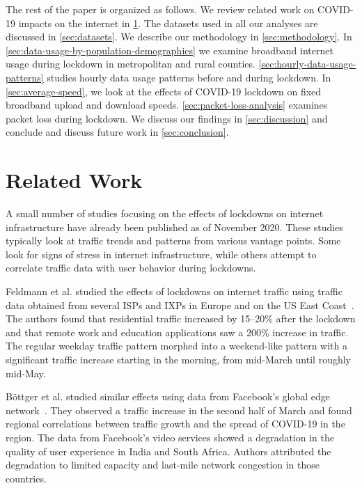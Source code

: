 \documentclass[conference,10pt]{IEEEtran}
\begin{document}
The rest of the paper is organized as follows. We review related work on COVID-19 impacts on the internet in \cref{sec:related-work}. The datasets used in all our analyses are discussed in \cref{sec:datasets}. We describe our methodology in \cref{sec:methodology}. In \cref{sec:data-usage-by-population-demographics} we examine broadband internet usage during lockdown in metropolitan and rural counties. \cref{sec:hourly-data-usage-patterns} studies hourly data usage patterns before and during lockdown. In \cref{sec:average-speed}, we look at the effects of COVID-19 lockdown on fixed broadband upload and download speeds. \cref{sec:packet-loss-analysis} examines packet loss during lockdown. We discuss our findings in \cref{sec:discussion} and conclude and discuss future work in \cref{sec:conclusion}.

\section{Related Work}\label{sec:related-work}



A small number of studies focusing on the effects of lockdowns on internet infrastructure have already been published as of November 2020. These studies typically look at traffic trends and patterns from various vantage points. Some look for signs of stress in internet infrastructure, while others attempt to correlate traffic data with user behavior during lockdowns.

Feldmann et al. studied the effects of lockdowns on internet traffic using traffic data obtained from several \glspl{ISP} and \glspl{IXP} in Europe and on the \gls{US} East Coast~\cite{feldmann2020lockdown}. The authors found that residential traffic increased by 15--20\% after the lockdown and that remote work and education applications saw a 200\% increase in traffic. The regular weekday traffic pattern morphed into a weekend-like pattern with a significant traffic increase starting in the morning, from mid-March until roughly mid-May.

B\"{o}ttger et al. studied similar effects using data from Facebook's global edge network~\cite{bottger2020internet}. They observed a traffic increase in the second half of March and found regional correlations between traffic growth and the spread of COVID-19 in the region. The data from Facebook's video services showed a degradation in the quality of user experience in India and South Africa. Authors attributed the degradation to limited capacity and last-mile network congestion in those countries.
\end{document}
